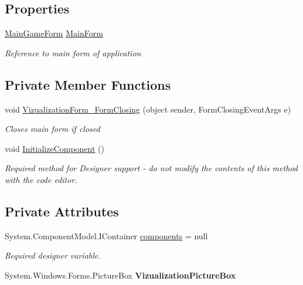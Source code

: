 \subsection*{Properties}
\begin{DoxyCompactItemize}
\item 
\mbox{\hyperlink{class_chess_tracking_1_1_user_interface_1_1_main_game_form}{Main\+Game\+Form}} \mbox{\hyperlink{class_chess_tracking_1_1_user_interface_1_1_vizualization_form_a3899ab06031df2d5b799662376c7dc56}{Main\+Form}}
\begin{DoxyCompactList}\small\item\em Reference to main form of application \end{DoxyCompactList}\end{DoxyCompactItemize}
\subsection*{Private Member Functions}
\begin{DoxyCompactItemize}
\item 
void \mbox{\hyperlink{class_chess_tracking_1_1_user_interface_1_1_vizualization_form_a3ffdeb953e96c258a81589c7a3920570}{Vizualization\+Form\+\_\+\+Form\+Closing}} (object sender, Form\+Closing\+Event\+Args e)
\begin{DoxyCompactList}\small\item\em Closes main form if closed \end{DoxyCompactList}\item 
void \mbox{\hyperlink{class_chess_tracking_1_1_user_interface_1_1_vizualization_form_a509b1e30f7e42828e98b0b4b874d7592}{Initialize\+Component}} ()
\begin{DoxyCompactList}\small\item\em Required method for Designer support -\/ do not modify the contents of this method with the code editor. \end{DoxyCompactList}\end{DoxyCompactItemize}
\subsection*{Private Attributes}
\begin{DoxyCompactItemize}
\item 
System.\+Component\+Model.\+I\+Container \mbox{\hyperlink{class_chess_tracking_1_1_user_interface_1_1_vizualization_form_a3ad0b7b18e0dc1a221aa768e738b5a4b}{components}} = null
\begin{DoxyCompactList}\small\item\em Required designer variable. \end{DoxyCompactList}\item 
\mbox{\label{class_chess_tracking_1_1_user_interface_1_1_vizualization_form_a18b3fdca95803610a506abe9a5c78571}} 
System.\+Windows.\+Forms.\+Picture\+Box {\bfseries Vizualization\+Picture\+Box}
\end{DoxyCompactItemize}


